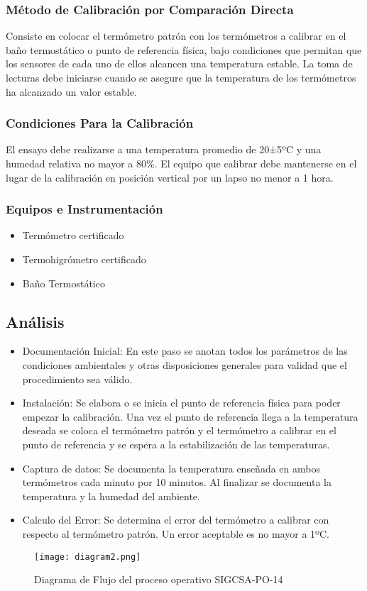 \subsubsection{Método de Calibración por Comparación Directa}

\par 
	Consiste en colocar el termómetro patrón con los termómetros a calibrar en el baño
	termostático o punto de referencia física, bajo condiciones que permitan que los
	sensores de cada uno de ellos alcancen una temperatura estable. La toma de lecturas
	debe iniciarse cuando se asegure que la temperatura de los termómetros ha alcanzado
	un valor estable\cite{po14}.
\subsubsection{Condiciones Para la Calibración}

\par 
	El ensayo debe realizarse a una temperatura promedio de 20±5ºC y una humedad
	relativa no mayor a 80\%. El equipo que calibrar debe mantenerse en el lugar de la
	calibración en posición vertical por un lapso no menor a 1 hora\cite{po14}.
	
\subsubsection{Equipos e Instrumentación \cite{po14}}

\begin{itemize}
	\item Termómetro certificado
	\item Termohigrómetro certificado
	\item Baño Termostático
\end{itemize}

\subsection{Análisis}

\begin{itemize}
\item Documentación Inicial: En este paso se anotan todos los parámetros de las condiciones ambientales y otras disposiciones generales para validad que el procedimiento sea válido.

\item Instalación: Se elabora o se inicia el punto de referencia física para poder empezar la calibración. Una vez el punto de referencia llega a la temperatura deseada se coloca el termómetro patrón y el termómetro a calibrar en el punto de referencia y se espera a la estabilización de las temperaturas.

\item Captura de datos: Se documenta la temperatura enseñada en ambos termómetros cada minuto por 10 minutos. Al finalizar se documenta la temperatura y la humedad del ambiente.

\item Calculo del Error: Se determina el error del termómetro a calibrar con respecto al termómetro patrón. Un error aceptable es no mayor a 1ºC.
\end{itemize}

\begin{figure}[H]
	\centering
	\texttt{[image: diagram2.png]}
	\caption{Diagrama de Flujo del proceso operativo SIGCSA-PO-14}
\end{figure}
